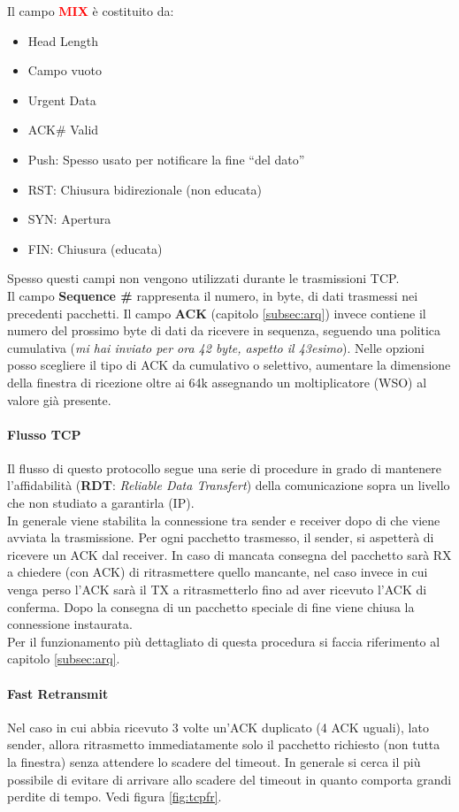 \documentclass[12pt]{article}
\begin{document}
Il campo \textcolor{Red}{\textbf{MIX}} è costituito da:
\begin{itemize}
  \item Head Length
  \item Campo vuoto
  \item Urgent Data
  \item ACK\# Valid
  \item Push: Spesso usato per notificare la fine ``del dato''
  \item RST: Chiusura bidirezionale (non educata)
  \item SYN: Apertura
  \item FIN: Chiusura (educata)
\end{itemize}
Spesso questi campi non vengono utilizzati durante le trasmissioni TCP.\\
Il campo \textbf{Sequence \#} rappresenta il numero, in byte, di dati trasmessi nei precedenti pacchetti. Il campo \textbf{ACK} (capitolo \ref{subsec:arq}) invece contiene il numero del prossimo byte di dati da ricevere in sequenza, seguendo una politica cumulativa (\textit{mi hai inviato per ora 42 byte, aspetto il 43esimo}). Nelle opzioni posso scegliere il tipo di ACK da cumulativo o selettivo, aumentare la dimensione della finestra di ricezione oltre ai 64k assegnando un moltiplicatore (WSO) al valore già presente.

\paragraph{Flusso TCP} Il flusso di questo protocollo segue una serie di procedure in grado di mantenere l'affidabilità (\textbf{RDT}: \textit{Reliable Data Transfert}) della comunicazione sopra un livello che non studiato a garantirla (IP).\\
In generale viene stabilita la connessione tra sender e receiver dopo di che viene avviata la trasmissione. Per ogni pacchetto trasmesso, il sender, si aspetterà di ricevere un ACK dal receiver. In caso di mancata consegna del pacchetto sarà RX a chiedere (con ACK) di ritrasmettere quello mancante, nel caso invece in cui venga perso l'ACK sarà il TX a ritrasmetterlo fino ad aver ricevuto l'ACK di conferma. Dopo la consegna di un pacchetto speciale di fine viene chiusa la connessione instaurata.\\
Per il funzionamento più dettagliato di questa procedura si faccia riferimento al capitolo \ref{subsec:arq}.

\paragraph{Fast Retransmit} Nel caso in cui abbia ricevuto 3 volte un'ACK duplicato (4 ACK uguali), lato sender, allora ritrasmetto immediatamente solo il pacchetto richiesto (non tutta la finestra) senza attendere lo scadere del timeout. In generale si cerca il più possibile di evitare di arrivare allo scadere del timeout in quanto comporta grandi perdite di tempo. Vedi figura \ref{fig:tcpfr}.
\end{document}
